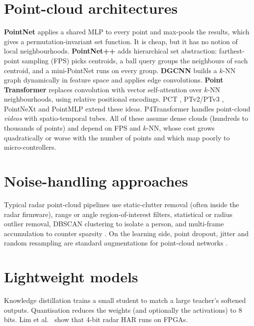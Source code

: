 \section{Point-cloud architectures}
\textbf{PointNet} \cite{qi2017pointnet} applies a shared MLP to every point and
max-pools the results, which gives a permutation-invariant set function. It is
cheap, but it has no notion of local neighbourhoods. \textbf{PointNet++}
\cite{qi2017pointnet2} adds hierarchical set abstraction: farthest-point sampling
(FPS) picks centroids, a ball query groups the neighbours of each centroid, and a
mini-PointNet runs on every group. \textbf{DGCNN} \cite{wang2019dgcnn} builds a
$k$-NN graph dynamically in feature space and applies edge convolutions.
\textbf{Point Transformer} \cite{zhao2021pt} replaces convolution with vector
self-attention over $k$-NN neighbourhoods, using relative positional encodings.
PCT \cite{guo2021pct}, PTv2/PTv3 \cite{wu2022ptv2,wu2024ptv3}, PointNeXt
\cite{qian2022pointnext} and PointMLP \cite{ma2022pointmlp} extend these ideas.
P4Transformer \cite{fan2021p4t} handles point-cloud \emph{videos} with
spatio-temporal tubes. All of these assume dense clouds (hundreds to thousands of
points) and depend on FPS and $k$-NN, whose cost grows quadratically or worse
with the number of points and which map poorly to micro-controllers.

\section{Noise-handling approaches}
Typical radar point-cloud pipelines use static-clutter removal (often inside the
radar firmware), range or angle region-of-interest filters, statistical or radius
outlier removal, DBSCAN clustering to isolate a person, and multi-frame
accumulation to counter sparsity \cite{singh2019radhar,salami2023tesla}. On the
learning side, point dropout, jitter and random resampling are standard
augmentations for point-cloud networks \cite{qi2017pointnet,qi2017pointnet2}.

\section{Lightweight models}
Knowledge distillation \cite{hinton2015kd} trains a small student to match a
large teacher's softened outputs. Quantisation \cite{jacob2018quant} reduces the
weights (and optionally the activations) to 8 bits. Lim et al.\
\cite{lim2024fpga} show that 4-bit radar HAR runs on FPGAs.

